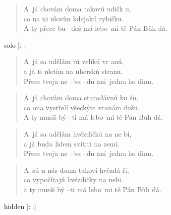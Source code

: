 \begin{song}{}
\begin{verse}
   A~já chovám doma takovú udičk u, \\
   co na ni ulovím kdejakú rybičku. \\
   A ty přece bu --deš má lebo~mi tě Pán Bůh dá. 
\end{verse}
  \begin{optional}{solo}
|:       :|
\end{optional}
\begin{verse}
   A~já sa udělám tú velikú vr anú, \\
   a já ti uletím na uherskú stranu. \\
   Přece tvoja ne --bu --du ani~jednu ho dinu. 
\end{verse}
\begin{verse}
   A~já chovám doma starodávnú ku šu, \\
   co ona vystřelí všeckým vranám dušu. \\
   A ty musíš bý --ti má lebo~mi tě Pán Bůh dá. 
\end{verse}
\begin{verse}
   A~já sa udělám hvězdičkú na ne bi, \\
   a já budu lidem svítiti na zemi. \\
   Přece tvoja ne --bu --du ani~jednu ho dinu. 
\end{verse}
\begin{verse}
   A~sú u nás doma takoví hvězdá ři, \\
   co vypočítajú hvězdičky na nebi. \\
   a ty musíš bý --ti má lebo~mi tě Pán Bůh dá. 
\end{verse}
  \begin{optional}{hidden}
|:       :| 
\end{optional}
\end{song}
\pagebreak
